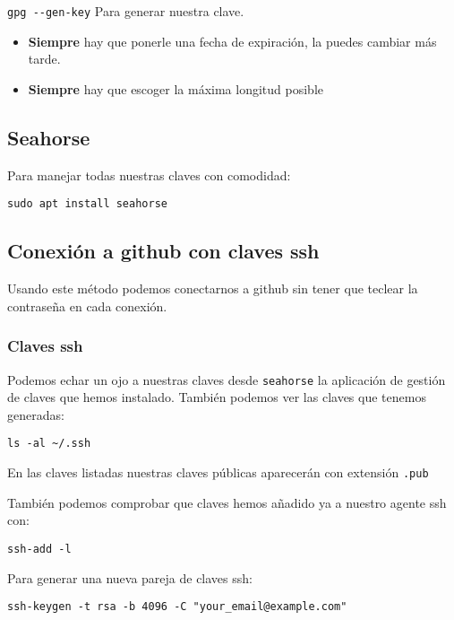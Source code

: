 \documentclass[
  12pt,
  spanish,
]{article}
\providecommand{\tightlist}{%
  \setlength{\itemsep}{0pt}\setlength{\parskip}{0pt}}
\begin{document}
\texttt{gpg\ -\/-gen-key} Para generar nuestra clave.

\begin{itemize}
\tightlist
\item
  \textbf{Siempre} hay que ponerle una fecha de expiración, la puedes
  cambiar más tarde.
\item
  \textbf{Siempre} hay que escoger la máxima longitud posible
\end{itemize}

\hypertarget{seahorse}{%
\subsection{Seahorse}\label{seahorse}}

Para manejar todas nuestras claves con comodidad:

\texttt{sudo\ apt\ install\ seahorse}

\hypertarget{conexiuxf3n-a-github-con-claves-ssh}{%
\subsection{Conexión a github con claves
ssh}\label{conexiuxf3n-a-github-con-claves-ssh}}

Usando este método podemos conectarnos a github sin tener que teclear la
contraseña en cada conexión.

\hypertarget{claves-ssh}{%
\subsubsection{Claves ssh}\label{claves-ssh}}

Podemos echar un ojo a nuestras claves desde \texttt{seahorse} la
aplicación de gestión de claves que hemos instalado. También podemos ver
las claves que tenemos generadas:

\begin{verbatim}
ls -al ~/.ssh
\end{verbatim}

En las claves listadas nuestras claves públicas aparecerán con extensión
\texttt{.pub}

También podemos comprobar que claves hemos añadido ya a nuestro agente
ssh con:

\begin{verbatim}
ssh-add -l
\end{verbatim}

Para generar una nueva pareja de claves ssh:

\begin{verbatim}
ssh-keygen -t rsa -b 4096 -C "your_email@example.com"
\end{verbatim}
\end{document}
